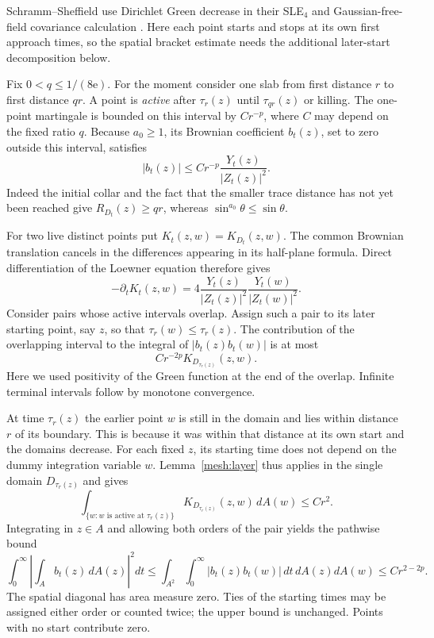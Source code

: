 \documentclass[11pt]{article}
\theoremstyle{definition}
\theoremstyle{remark}
\numberwithin{equation}{section}
\begin{document}
Schramm--Sheffield use Dirichlet Green decrease in their SLE$_4$
and Gaussian-free-field covariance calculation
\cite[Lemmas~2.5--2.6]{schrammsheffield2013}.
Here each point starts and stops at its own first approach times, so
the spatial bracket estimate needs the additional later-start
decomposition below.

Fix $0<q\le1/(8\mathrm e)$.  For the moment consider one
slab from first distance $r$ to first distance $qr$.  A point is
\emph{active} after $\tau_r(z)$ until $\tau_{qr}(z)$ or killing.  The
one-point martingale is bounded on this interval by $C r^{-p}$, where
$C$ may depend on the fixed ratio $q$.  Because $a_0\ge1$, its Brownian
coefficient $b_t(z)$, set to zero outside this interval, satisfies
\begin{equation}
 |b_t(z)|\le C r^{-p}\frac{Y_t(z)}{|Z_t(z)|^2}.
 \label{mesh:active-coefficient}
\end{equation}
Indeed the initial collar and the fact that the smaller trace
distance has not yet been reached give $R_{D_t}(z)\ge qr$, whereas
$\sin^{a_0}\theta\le\sin\theta$.

For two live distinct points put $K_t(z,w)=K_{D_t}(z,w)$.  The common
Brownian translation cancels in the differences appearing in its
half-plane formula.  Direct differentiation of the Loewner equation
therefore gives
\begin{equation}
 -\partial_tK_t(z,w)
 =4\frac{Y_t(z)}{|Z_t(z)|^2}\frac{Y_t(w)}{|Z_t(w)|^2}.
 \label{mesh:green-decrease}
\end{equation}
Consider pairs whose active intervals overlap.  Assign such a pair to
its later starting point, say $z$, so that
$\tau_r(w)\le\tau_r(z)$.  The contribution of the overlapping
interval to the integral of $|b_t(z)b_t(w)|$ is at most
\begin{equation}
 Cr^{-2p}K_{D_{\tau_r(z)}}(z,w).
 \label{mesh:pair-bound}
\end{equation}
Here we used positivity of the Green function at the end of the
overlap.  Infinite terminal intervals follow by monotone convergence.

At time $\tau_r(z)$ the earlier point $w$ is still in the domain and
lies within distance $r$ of its boundary.  This is because it was
within that distance at its own start and the domains decrease.
For each fixed $z$, its starting time does not depend on the dummy
integration variable $w$.  Lemma~\ref{mesh:layer} thus applies in the
single domain $D_{\tau_r(z)}$ and gives
\[
 \int_{\{w:\text{$w$ is active at $\tau_r(z)$}\}}
 K_{D_{\tau_r(z)}}(z,w)\,dA(w)\le Cr^2.
\]
Integrating in $z\in A$ and allowing both orders of the pair yields
the pathwise bound
\begin{equation}
 \int_0^\infty\left|\int_A b_t(z)\,dA(z)\right|^2dt
 \le\int_{A^2}\int_0^\infty |b_t(z)b_t(w)|\,dt\,dA(z)dA(w)
 \le Cr^{2-2p}.
 \label{mesh:bracket-bound}
\end{equation}
The spatial diagonal has area measure zero.  Ties of the starting
times may be assigned either order or counted twice; the upper bound
is unchanged.  Points with no start contribute zero.
\end{document}
